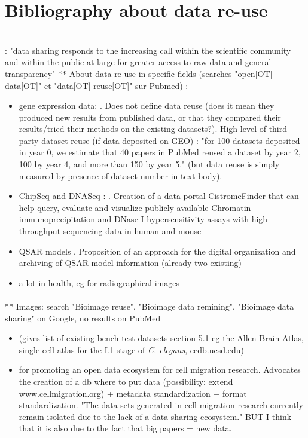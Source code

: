 \documentclass[12pt]{article}
\begin{document}
\section{Bibliography about data re-use}
~\cite{pmid18636105}\\
\cite{pmid24904347}: "data sharing responds to the increasing call within the scientific community and within the public at large for greater access to raw data and general transparency"
** About data re-use in specific fields (searches "open[OT] data[OT]" et "data[OT] reuse[OT]" sur Pubmed) :
\begin{itemize}
\item gene expression data: \cite{pmid24109559}. Does not define data reuse (does it mean they produced new results from published data, or that they compared their results/tried their methods on the existing datasets?). High level of third-party dataset reuse (if data deposited on GEO) : "for 100 datasets deposited in year 0, we estimate that 40
papers in PubMed reused a dataset by year 2, 100 by year 4, and more than 150 by year 5." (but data reuse is simply measured by presence of dataset number in text body).
\item ChipSeq and DNASeq : \cite{pmid23508969}. Creation of a data portal CistromeFinder that can help query, evaluate and visualize publicly available Chromatin immunoprecipitation and DNase I hypersensitivity assays with high-throughput sequencing data in human and mouse
\item QSAR models \cite{pmid24910716}. Proposition of an approach for the digital
organization and archiving of QSAR model information (already two existing)
\item a lot in health, eg for radiographical images ~\cite{pmid24309199}
\end{itemize}
\paragraph{}
** Images: search "Bioimage reuse", "Bioimage data remining", "Bioimage data sharing" on Google, no results on PubMed
\begin{itemize}
\item \cite{pmid18603566} (gives list of existing bench test datasets section 5.1 eg the Allen Brain Atlas, single-cell atlas for the L1 stage of \textit{C. elegans}, ccdb.ucsd.edu)
\item \cite{pmid25484346} for promoting an open data ecosystem for cell migration research. Advocates the creation of a db where to put data (possibility: extend www.cellmigration.org) + metadata standardization + format standardization. "The data sets generated in cell migration research currently remain isolated due to the lack of a data sharing ecosystem." BUT I think that it is also due to the fact that big papers = new data.
\end{itemize}
\end{document}

